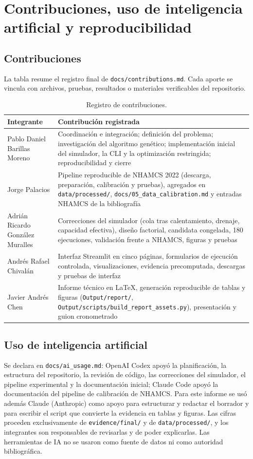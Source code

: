 \section{Contribuciones, uso de inteligencia artificial y reproducibilidad}

\subsection{Contribuciones}
La tabla resume el registro final de \texttt{docs/contributions.md}. Cada aporte se
vincula con archivos, pruebas, resultados o materiales verificables del repositorio.

\begin{table}[ht]
\centering\small
\caption{Registro de contribuciones.}
\label{tab:contribuciones}
\begin{tabularx}{\linewidth}{@{}l X@{}}
\toprule
Integrante & Contribución registrada \\
\midrule
Pablo Daniel Barillas Moreno & Coordinación e integración; definición del problema; investigación del algoritmo genético; implementación inicial del simulador, la CLI y la optimización restringida; reproducibilidad y cierre \\
Jorge Palacios & Pipeline reproducible de NHAMCS 2022 (descarga, preparación, calibración y pruebas), agregados en \texttt{data/processed/}, \texttt{docs/05\_data\_calibration.md} y entradas NHAMCS de la bibliografía \\
Adrián Ricardo González Muralles & Correcciones del simulador (cola tras calentamiento, drenaje, capacidad efectiva), diseño factorial, candidata congelada, 180 ejecuciones, validación frente a NHAMCS, figuras y pruebas \\
Andrés Rafael Chivalán & Interfaz Streamlit en cinco páginas, formularios de ejecución controlada, visualizaciones, evidencia precomputada, descargas y pruebas de interfaz \\
Javier Andrés Chen & Informe técnico en LaTeX, generación reproducible de tablas y figuras (\texttt{Output/report/}, \texttt{Output/scripts/build\_report\_assets.py}), presentación y guion cronometrado \\
\bottomrule
\end{tabularx}
\end{table}

\subsection{Uso de inteligencia artificial}
Se declara en \texttt{docs/ai\_usage.md}: OpenAI Codex apoyó la planificación, la estructura
del repositorio, la revisión de código, las correcciones del simulador, el pipeline
experimental y la documentación inicial; Claude Code apoyó la documentación del pipeline de
calibración de NHAMCS. Para este informe se usó además Claude (Anthropic) como apoyo para
estructurar y redactar el borrador y para escribir el script que convierte la evidencia en
tablas y figuras. Las cifras proceden exclusivamente de \texttt{evidence/final/} y de
\texttt{data/processed/}, y los integrantes son responsables de revisarlas y de poder
explicarlas. Las herramientas de IA no se usaron como fuente de datos ni como autoridad
bibliográfica.

